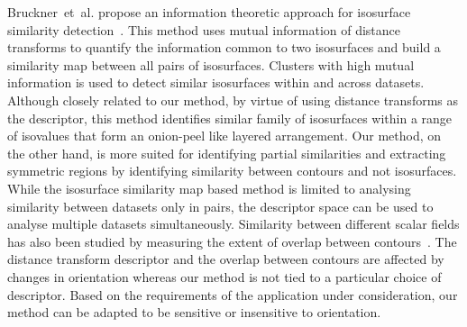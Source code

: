 \documentclass[review,journal]{vgtc}         %
\begin{document}
Bruckner~et~al. propose an information theoretic approach for isosurface similarity 
detection~\cite{BrucknerM10,haidacher11}. This method uses mutual information of distance 
transforms to quantify the information common to two isosurfaces and build a similarity map 
between all pairs of isosurfaces. Clusters with high mutual information is used to detect 
similar isosurfaces within and across datasets. Although closely related to our method, 
by virtue of using distance transforms as the descriptor, 
this method identifies similar family of isosurfaces within a range of isovalues that 
form an onion-peel like layered arrangement. Our method, on the other hand, is more suited 
for identifying partial similarities and extracting symmetric regions by identifying
similarity between contours and not isosurfaces. While the isosurface similarity map based
method is limited to analysing similarity between
datasets only in pairs, the descriptor space can be used to analyse multiple datasets simultaneously.
Similarity between different scalar fields has also been studied by measuring the extent of overlap
between contours~\cite{SchneiderWCHS08,schn13}. The distance transform
descriptor and the overlap between contours are affected by changes in orientation
whereas our method is not tied to a particular choice of descriptor. Based on the requirements of 
the application under consideration, our method  can be adapted to be sensitive or 
insensitive to orientation. 
\end{document}
